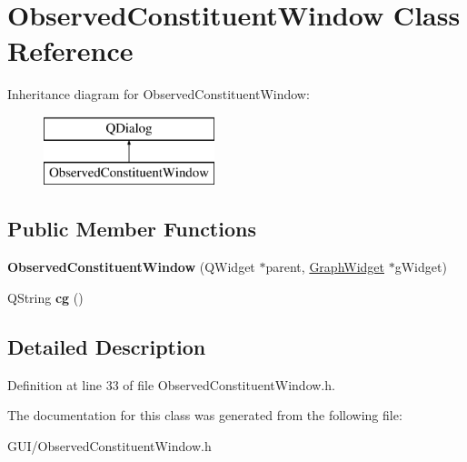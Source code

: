 \hypertarget{class_observed_constituent_window}{}\section{Observed\+Constituent\+Window Class Reference}
\label{class_observed_constituent_window}
Inheritance diagram for Observed\+Constituent\+Window\+:\begin{figure}[H]
\begin{center}
\leavevmode
\includegraphics[height=2.000000cm]{class_observed_constituent_window}
\end{center}
\end{figure}
\subsection*{Public Member Functions}
\begin{DoxyCompactItemize}
\item 
\mbox{\label{class_observed_constituent_window_ac7f31ae05fdf138304fce58781dfa1cf}} 
{\bfseries Observed\+Constituent\+Window} (Q\+Widget $\ast$parent, \hyperlink{class_graph_widget}{Graph\+Widget} $\ast$g\+Widget)
\item 
\mbox{\label{class_observed_constituent_window_a1e90ce2b08ad0f72c06d083e6a21cb1a}} 
Q\+String {\bfseries cg} ()
\end{DoxyCompactItemize}


\subsection{Detailed Description}


Definition at line 33 of file Observed\+Constituent\+Window.\+h.



The documentation for this class was generated from the following file\+:\begin{DoxyCompactItemize}
\item 
G\+U\+I/Observed\+Constituent\+Window.\+h\end{DoxyCompactItemize}
